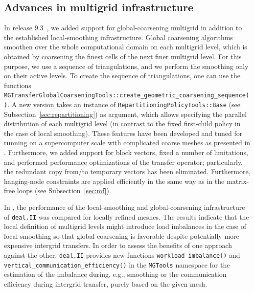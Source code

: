 \documentclass{ansarticle-preprint}
\newcommand{\specialword}[1]{\texttt{#1}}
\newcommand{\dealii}{{\specialword{deal.II}}\xspace}
\begin{document}
\subsection{Advances in multigrid infrastructure}\label{sec:multigrid}

In release 9.3~\cite{dealII93}, we added support for global-coarsening multigrid in
addition to the established local-smoothing infrastructure. Global
coarsening algorithms smoothen over the whole computational domain on each
multigrid level, which is obtained by coarsening the finest cells of
the next finer multigrid level.
For this purpose, we use a sequence of triangulations, and we perform
the smoothing only on their active levels. To create the sequence of
triangulations, one can use the functions \texttt{MGTransferGlobalCoarseningTools::create\_geometric\_coarsening\_sequence()}. A new version takes an
instance of \texttt{RepartitioningPolicyTools::Base} (see Subsection~\ref{sec:repartitioning}) as argument, which allows specifying the parallel
distribution of each multigrid level (in contrast to the fixed first-child policy in the case of local smoothing). These features have been developed and tuned for running on a supercomputer scale
with complicated coarse meshes as presented in \cite{kronbichler2021next}.
Furthermore, we added support for block vectors,
fixed a number of limitations, and performed performance optimizations of
the transfer operator; particularly, the redundant copy from/to temporary vectors
has been eliminated. Furthermore, hanging-node constraints are applied
efficiently in the same way as in the matrix-free loops (see Subsection~\ref{sec:mf}).

In \cite{munch2022gc}, the performance of the local-smoothing and global-coarsening
infrastructure of \dealii was compared for locally refined meshes. The results indicate that
the local definition of multigrid levels might introduce load imbalances
in the case of local smoothing so that global coarsening is favorable despite
potentially more expensive intergrid transfers. In order to assess the benefits
of one approach against the other, \dealii provides new functions
\texttt{workload\_imbalance()} and \texttt{vertical\_communication\_efficiency()}
in the \texttt{MGTools} namespace for the  estimation of the imbalance during, e.g.,
smoothing or the
communication efficiency during intergrid transfer, purely based on the given mesh.
\end{document}
